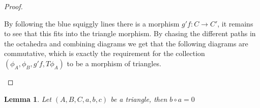 \documentclass[12pt]{article}
\newtheorem{lemma}[theorem]{Lemma}
\theoremstyle{definition}
\theoremstyle{remark}
\begin{document}
\begin{proof}
\begin{minipage}[t]{0.48\textwidth}
\begin{center}
                        \end{center}
                    \end{minipage}
                    By following the blue squiggly lines there is a morphism $g'f:C\rightarrow C'$, it remains to see that this fits into the triangle morphism. By chasing the different paths in the octahedra and combining diagrams we get that the following diagrams are commutative, which is exactly the requirement for the collection $(\phi_A,\phi_B,g'f,T\phi_A)$ to be a morphism of triangles.
                    \begin{center}
                    \end{center}

            \end{proof}

            \begin{lemma}
                Let $(A,B,C,a,b,c)$ be a triangle, then $b\circ a=0$
            \end{lemma}
\end{document}
